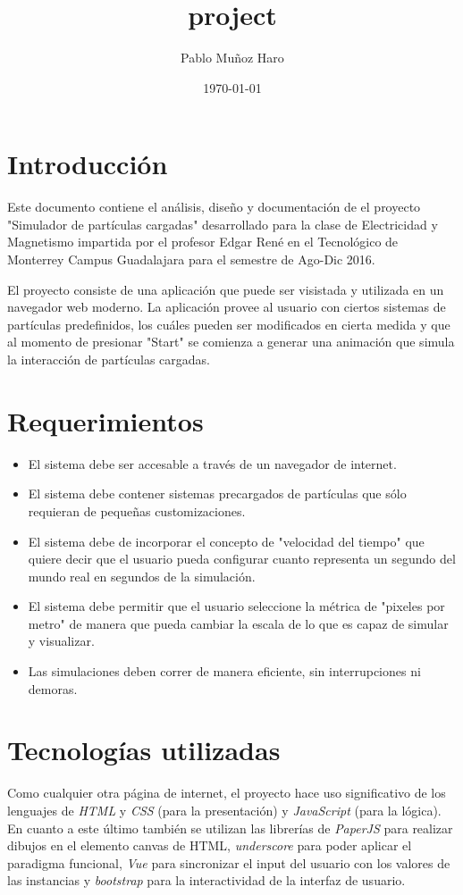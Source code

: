 \documentclass[11pt]{article}
\author{Pablo Muñoz Haro}
\date{\today}
\title{project}
\begin{document}
\maketitle
\tableofcontents

\clearpage

\section{Introducción}
\label{sec-1}
Este documento contiene el análisis, diseño y documentación de el
proyecto "Simulador de partículas cargadas" desarrollado para la clase
de Electricidad y Magnetismo impartida por el profesor Edgar René en
el Tecnológico de Monterrey Campus Guadalajara para el semestre de
Ago-Dic 2016.

El proyecto consiste de una aplicación que puede ser visistada y
utilizada en un navegador web moderno. La aplicación provee al usuario
con ciertos sistemas de partículas predefinidos, los cuáles pueden ser
modificados en cierta medida y que al momento de presionar "Start" se
comienza a generar una animación que simula la interacción de
partículas cargadas.

\section{Requerimientos}
\label{sec-2}
\begin{itemize}
\item El sistema debe ser accesable a través de un navegador de internet.
\item El sistema debe contener sistemas precargados de partículas que sólo
requieran de pequeñas customizaciones.
\item El sistema debe de incorporar el concepto de "velocidad del tiempo"
que quiere decir que el usuario pueda configurar cuanto representa
un segundo del mundo real en segundos de la simulación.
\item El sistema debe permitir que el usuario seleccione la métrica de
"pixeles por metro" de manera que pueda cambiar la escala de lo que
es capaz de simular y visualizar.
\item Las simulaciones deben correr de manera eficiente, sin
interrupciones ni demoras.
\end{itemize}

\section{Tecnologías utilizadas}
\label{sec-3}
Como cualquier otra página de internet, el proyecto hace uso
significativo de los lenguajes de \emph{HTML} y \emph{CSS} (para la
presentación) y \emph{JavaScript} (para la lógica). En cuanto a este último
también se utilizan las librerías de \emph{PaperJS} para realizar dibujos
en el elemento canvas de HTML, \emph{underscore} para poder aplicar el
paradigma funcional, \emph{Vue} para sincronizar el input del usuario con
los valores de las instancias y \emph{bootstrap} para la interactividad de
la interfaz de usuario.
\end{document}
